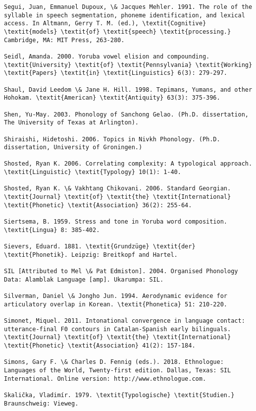 \begin{verbatim}
Segui, Juan, Emmanuel Dupoux, \& Jacques Mehler. 1991. The role of the syllable in speech segmentation, phoneme identification, and lexical access. In Altmann, Gerry T. M. (ed.), \textit{Cognitive} \textit{models} \textit{of} \textit{speech} \textit{processing.} Cambridge, MA: MIT Press, 263-280.

Seidl, Amanda. 2000. Yoruba vowel elision and compounding. \textit{University} \textit{of} \textit{Pennsylvania} \textit{Working} \textit{Papers} \textit{in} \textit{Linguistics} 6(3): 279-297.

Shaul, David Leedom \& Jane H. Hill. 1998. Tepimans, Yumans, and other Hohokam. \textit{American} \textit{Antiquity} 63(3): 375-396.

Shen, Yu-May. 2003. Phonology of Sanchong Gelao. (Ph.D. dissertation, The University of Texas at Arlington).

Shiraishi, Hidetoshi. 2006. Topics in Nivkh Phonology. (Ph.D. dissertation, University of Groningen.) 

Shosted, Ryan K. 2006. Correlating complexity: A typological approach. \textit{Linguistic} \textit{Typology} 10(1): 1-40.

Shosted, Ryan K. \& Vakhtang Chikovani. 2006. Standard Georgian. \textit{Journal} \textit{of} \textit{the} \textit{International} \textit{Phonetic} \textit{Association} 36(2): 255-64.

Siertsema, B. 1959. Stress and tone in Yoruba word composition. \textit{Lingua} 8: 385-402.

Sievers, Eduard. 1881. \textit{Grundzüge} \textit{der} \textit{Phonetik}. Leipzig: Breitkopf and Hartel.

SIL [Attributed to Mel \& Pat Edmiston]. 2004. Organised Phonology Data: Alamblak Language [amp]. Ukarumpa: SIL.

Silverman, Daniel \& Jongho Jun. 1994. Aerodynamic evidence for articulatory overlap in Korean. \textit{Phonetica} 51: 210-220.

Simonet, Miquel. 2011. Intonational convergence in language contact: utterance-final F0 contours in Catalan-Spanish early bilinguals. \textit{Journal} \textit{of} \textit{the} \textit{International} \textit{Phonetic} \textit{Association} 41(2): 157-184.

Simons, Gary F. \& Charles D. Fennig (eds.). 2018. Ethnologue: Languages of the World, Twenty-first edition. Dallas, Texas: SIL International. Online version: http://www.ethnologue.com.

Skalička, Vladimír. 1979. \textit{Typologische} \textit{Studien.} Braunschweig: Vieweg. 


\end{verbatim}

